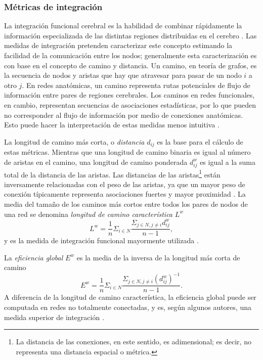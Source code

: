 \subsubsection{Métricas de integración}
La integración funcional cerebral es la habilidad de combinar rápidamente la información especializada de las distintas regiones distribuidas en el cerebro \parencite{Tononi1994}.
Las medidas de integración pretenden caracterizar este concepto estimando la facilidad de la comunicación entre los nodos; generalmente esta caracterización es con base en el concepto de camino y distancia.
Un camino, en teoría de grafos, es la secuencia de nodos y aristas que hay que atravesar para pasar de un nodo $i$ a otro $j$.
En redes anatómicas, un camino representa rutas potenciales de flujo de información entre pares de regiones cerebrales.
Los caminos en redes funcionales, en cambio, representan secuencias de asociaciones estadísticas, por lo que pueden no corresponder al flujo de información por medio de conexiones anatómicas. Esto puede hacer la interpretación de estas medidas menos intuitiva \parencite{Rubinov2010}. \par
La longitud de camino más corta, o \emph{distancia} $d_{ij}$ es la base para el cálculo de estas métricas.
Mientras que una longitud de camino binaria es igual al número de aristas en el camino, una longitud de camino ponderada $d_{ij}^w$ es igual a la suma total de la distancia de las aristas.
Las distancias de las aristas\footnote{La distancia de las conexiones, en este sentido, es adimensional; es decir, no representa una distancia espacial o métrica.} están inversamente relacionadas con el peso de las aristas, ya que un mayor peso de conexión típicamente representa asociaciones fuertes y mayor proximidad \parencite{Rubinov2010}.
La media del tamaño de los caminos más cortos entre todos los pares de nodos de una red se denomina \emph{longitud de camino característica} $L^w$ \parencite{Watts1998}
\begin{equation}\label{eqCPL}
    L^w=\frac{1}{n}\Sigma_{i \in N}\frac{\Sigma_{j \in N,j\neq i}d_{ij}^w}{n-1},
\end{equation}
y es la medida de integración funcional mayormente utilizada \parencite{Rubinov2010}.\par
La \emph{eficiencia global} $E^w$ \parencite{Latora2001} es la media de la inversa de la longitud más corta de camino
\begin{equation}\label{eqEglob}
    E^w=\frac{1}{n}\Sigma_{i \in N}\frac{\Sigma_{j \in N, j \neq i}(d_{ij}^w)^{-1}}{n-1}.
\end{equation}
A diferencia de la longitud de camino característica, la eficiencia global puede ser computada en redes no totalmente conectadas, y es, según algunos autores, una medida superior de integración \parencite{Achard2007}.

